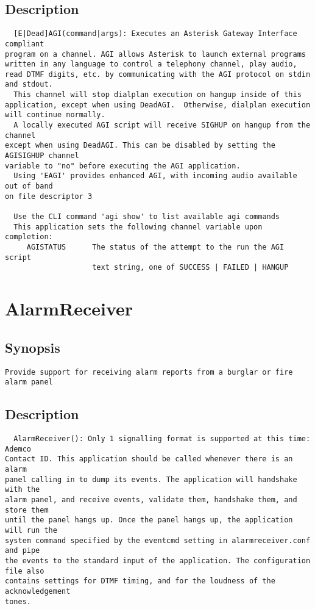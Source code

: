 \subsection{Description}
\begin{verbatim}
  [E|Dead]AGI(command|args): Executes an Asterisk Gateway Interface compliant
program on a channel. AGI allows Asterisk to launch external programs
written in any language to control a telephony channel, play audio,
read DTMF digits, etc. by communicating with the AGI protocol on stdin
and stdout.
  This channel will stop dialplan execution on hangup inside of this
application, except when using DeadAGI.  Otherwise, dialplan execution
will continue normally.
  A locally executed AGI script will receive SIGHUP on hangup from the channel
except when using DeadAGI. This can be disabled by setting the AGISIGHUP channel
variable to "no" before executing the AGI application.
  Using 'EAGI' provides enhanced AGI, with incoming audio available out of band
on file descriptor 3

  Use the CLI command 'agi show' to list available agi commands
  This application sets the following channel variable upon completion:
     AGISTATUS      The status of the attempt to the run the AGI script
                    text string, one of SUCCESS | FAILED | HANGUP

\end{verbatim}


\section{AlarmReceiver}
\subsection{Synopsis}
\begin{verbatim}
Provide support for receiving alarm reports from a burglar or fire alarm panel
\end{verbatim}
\subsection{Description}
\begin{verbatim}
  AlarmReceiver(): Only 1 signalling format is supported at this time: Ademco
Contact ID. This application should be called whenever there is an alarm
panel calling in to dump its events. The application will handshake with the
alarm panel, and receive events, validate them, handshake them, and store them
until the panel hangs up. Once the panel hangs up, the application will run the
system command specified by the eventcmd setting in alarmreceiver.conf and pipe
the events to the standard input of the application. The configuration file also
contains settings for DTMF timing, and for the loudness of the acknowledgement
tones.

\end{verbatim}


